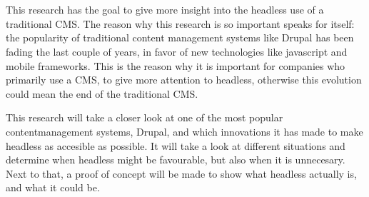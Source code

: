 \chapter*{}
This research has the goal to give more insight into the headless use of a traditional CMS. The reason why this research is so important speaks for itself: the popularity of traditional content management systems like Drupal has been fading the last couple of years, in favor of new technologies like javascript and mobile frameworks. This is the reason why it is important for companies who primarily use a CMS, to give more attention to headless, otherwise this evolution could mean the end of the traditional CMS.

This research will take a closer look at one of the most popular contentmanagement systems, Drupal, and which innovations it has made to make headless as accesible as possible. It will take a look at different situations and determine when headless might be favourable, but also when it is unnecesary. Next to that, a proof of concept will be made to show what headless actually is, and what it could be.
